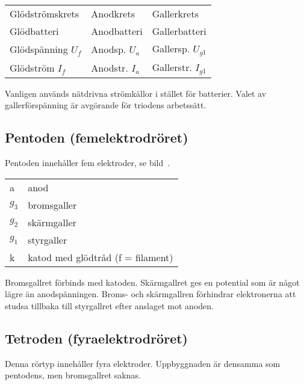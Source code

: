 \begin{center}
\begin{tabular}{lll}
Glödströmskrets      & Anodkrets        &  Gallerkrets \\
Glödbatteri          & Anodbatteri      &  Gallerbatteri \\
Glödspänning \(U_f\) & Anodsp. \(U_a\)  &  Gallersp. \(U_{g1}\) \\
Glödström \(I_f\)    & Anodstr. \(I_a\) &  Gallerstr. \(I_{g1}\) \\
\end{tabular}
\end{center}

\noindent
Vanligen används nätdrivna strömkällor i stället för batterier.
Valet av gallerförspänning är avgörande för triodens arbetssätt.

\subsection{Pentoden (femelektrodröret)}

Pentoden innehåller fem elektroder, se bild~.

\begin{center}
\begin{tabular}{ll}
  a       & anod \\
  \(g_3\) & bromsgaller \\
  \(g_2\) & skärmgaller \\
  \(g_1\) & styrgaller \\
  k      & katod med glödtråd (f = filament) \\
\end{tabular}
\end{center}

Bromsgallret förbinds med katoden.
Skärmgallret ges en potential som är något lägre än anodspänningen.
Broms- och skärmgallren förhindrar elektronerna att studsa tillbaka till
styrgallret efter anslaget mot anoden.

\subsection{Tetroden (fyraelektrodröret)}

Denna rörtyp innehåller fyra elektroder.
Uppbyggnaden är densamma som pentodens, men bromsgallret saknas.


